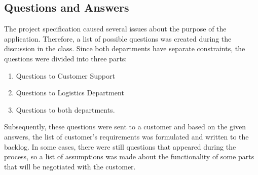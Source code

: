 \documentclass[a4paper]{article}
\begin{document}
       
    \subsection{Questions and Answers}
    
   The project specification caused several issues about the purpose of the application. Therefore, a list of possible questions was created during the discussion in the class. Since both departments have separate constraints, the questions were divided into three parts:
    \begin{enumerate}
        \item Questions to Customer Support
        \item Questions to Logistics Department
        \item  Questions to both departments.
    \end{enumerate}
   Subsequently, these questions were sent to a customer and based on the given answers, the list of customer’s requirements was formulated and written to the backlog.
  In some cases, there were still questions that appeared during the process, so a list of assumptions was made about the functionality of some parts that will be negotiated with the customer.
    
\end{document}
